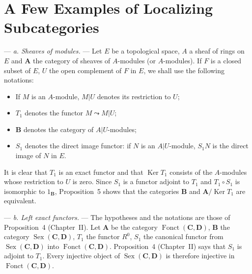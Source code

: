 %
%

\section{A Few Examples of Localizing Subcategories}

--- \emph{a. Sheaves of modules.} --- Let $E$ be a topological space, $A$
a sheaf of rings on $E$ and $\mathbf{A}$ the category of sheaves of
$A$-modules (or $A$-modules). If $F$ is a closed subset of $E$, $U$ the
open complement of $F$ in $E$, we shall use the following notations:
\begin{itemize}
\item If $M$ is an $A$-module, $M|U$ denotes its restriction to $U$;
\item $T_1$ denotes the functor $M\leadsto M|U$;
\item $\mathbf{B}$ denotes the category of $A|U$-modules;
\item $S_1$ denotes the direct image functor: if $N$ is an $A|U$-module,
$S_1N$ is the direct image of $N$ in $E$.
\end{itemize}

It is clear that $T_1$ is an exact functor and that
$\operatorname{Ker}T_1$ consists of the $A$-modules whose restriction to
$U$ is zero. Since $S_1$ is a functor adjoint to $T_1$ and
$T_1\circ S_1$ is isomorphic to $1_{\mathbf{B}}$, Proposition~5 shows that
the categories $\mathbf{B}$ and $\mathbf{A}/\operatorname{Ker}T_1$ are
equivalent.

--- \emph{b. Left exact functors.} --- The hypotheses and the notations
are those of Proposition~4 (Chapter~II). Let $\mathbf{A}$ be the category
$\operatorname{Fonct}(\mathbf{C},\mathbf{D})$, $\mathbf{B}$ the category
$\operatorname{Sex}(\mathbf{C},\mathbf{D})$, $T_1$ the functor $R^{0}$,
$S_1$ the canonical functor from
$\operatorname{Sex}(\mathbf{C},\mathbf{D})$ into
$\operatorname{Fonct}(\mathbf{C},\mathbf{D})$. Proposition~4 (Chapter~II)
says that $S_1$ is adjoint to $T_1$. Every injective object of
$\operatorname{Sex}(\mathbf{C},\mathbf{D})$ is therefore injective in
$\operatorname{Fonct}(\mathbf{C},\mathbf{D})$.

